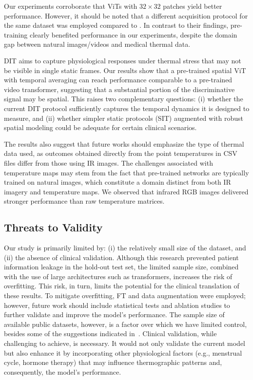 \documentclass[runningheads]{llncs}
\begin{document}
Our experiments corroborate that \ac{ViTs} with $32 \times 32$ patches
yield better performance. However, it should be noted that a different
acquisition protocol for the same dataset was employed compared to
\cite{Garia2023}. In contrast to their findings, pre-training clearly
benefited performance in our experiments, despite the domain gap between
natural images/videos and medical thermal data.

\ac{DIT} aims to capture physiological responses under thermal stress
that may not be visible in single static frames. Our results show that
a pre-trained spatial \ac{ViT} with temporal averaging can reach
performance comparable to a pre-trained video transformer, suggesting
that a substantial portion of the discriminative signal may be
spatial. This raises two complementary questions: (i) whether the
current \ac{DIT} protocol sufficiently captures the
temporal dynamics it is designed to measure, and (ii) whether simpler
static protocols (\ac{SIT}) augmented with robust spatial modeling could be
adequate for certain clinical scenarios.

The results also suggest that future works should emphasize the type
of thermal data used, as outcomes obtained directly from the point
temperatures in CSV files differ from those using \ac{IR} images. The
challenges associated with temperature maps may stem from the fact
that pre-trained networks are typically trained on natural images,
which constitute a domain distinct from both \ac{IR} imagery and
temperature maps. We observed that infrared RGB images delivered
stronger performance than raw temperature matrices.
\newpage
\subsection{Threats to Validity}
\label{sec:threats-validity}

Our study is primarily limited by: (i) the relatively small size of
the dataset, and (ii) the absence of clinical validation. Although
this research prevented patient information leakage in the hold-out
test set, the limited sample size, combined with the use of large
architectures such as transformers, increases the risk of
overfitting. This risk, in turn, limits the potential for the clinical
translation of these results. To mitigate overfitting, \ac{FT} and
data augmentation were employed; however, future work should include
statistical tests and ablation studies to further validate and improve
the model's performance. The sample size of available public datasets,
however, is a factor over which we have limited control, besides some
of the suggestions indicated in~\cite{Ryan2025}. Clinical validation,
while challenging to achieve, is necessary. It would not only validate
the current model but also enhance it by incorporating other
physiological factors (e.g., menstrual cycle, hormone therapy) that
may influence thermographic patterns and, consequently, the model's
performance.
\end{document}

